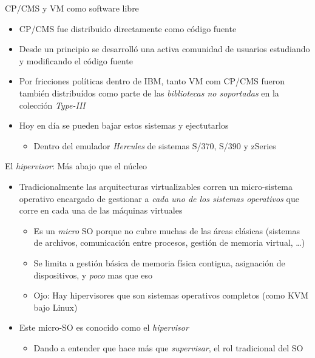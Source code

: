 \documentclass[presentation]{beamer}
\begin{document}
\begin{frame}[label={sec:orga5035f5}]{CP/CMS y VM como software libre}
\begin{itemize}
\item CP/CMS fue distribuido directamente como código fuente
\item Desde un principio se desarrolló una activa comunidad de usuarios
estudiando y modificando el código fuente
\item Por fricciones políticas dentro de IBM, tanto VM com CP/CMS fueron
también distribuídos como parte de las \emph{bibliotecas no soportadas}
en la colección \emph{Type-III}
\item Hoy en día se pueden bajar estos sistemas y ejectutarlos
\begin{itemize}
\item Dentro del emulador \emph{Hercules} de sistemas S/370, S/390 y zSeries
\end{itemize}
\end{itemize}
\end{frame}

\begin{frame}[label={sec:orgcfea364}]{El \emph{hipervisor}: Más abajo que el núcleo}
\begin{itemize}
\item Tradicionalmente las arquitecturas virtualizables corren un
micro-sistema operativo encargado de gestionar a \emph{cada uno de los
sistemas operativos} que corre en cada una de las máquinas virtuales
\begin{itemize}
\item Es un \emph{micro} SO porque no cubre muchas de las áreas clásicas
(sistemas de archivos, comunicación entre procesos, gestión de
memoria virtual, \ldots{})
\item Se limita a gestión básica de memoria física contigua, asignación
de dispositivos, y \emph{poco} mas que eso
\item Ojo: Hay hipervisores que son sistemas operativos completos (como
KVM bajo Linux)
\end{itemize}
\item Este micro-SO es conocido como el \emph{hipervisor}
\begin{itemize}
\item Dando a entender que hace más que \emph{supervisar}, el rol tradicional
del SO
\end{itemize}
\end{itemize}
\end{frame}
\end{document}
